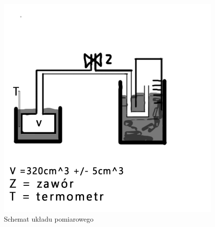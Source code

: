 \documentclass{article}
\begin{document}
\begin{figure}[H]
    \centering
    \includegraphics[width=0.75\linewidth]{zdjęcie1.png}
    \caption{Schemat układu pomiarowego}
    \label{fig:Rysunek_1}
\end{figure}
\end{document}

